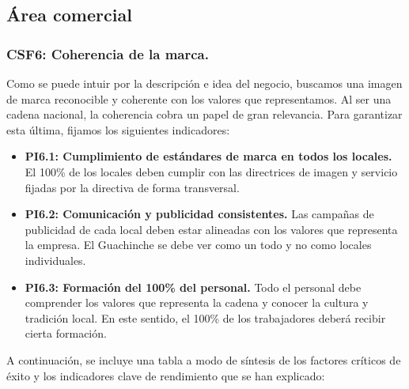 \documentclass[12pt]{opticajnl}
\begin{document}
\subsection{Área comercial}

\subsubsection*{CSF6: Coherencia de la marca.}

Como se puede intuir por la descripción e idea del negocio, buscamos una imagen de marca reconocible y coherente con los valores que representamos. Al ser una cadena nacional, la coherencia cobra un papel de gran relevancia. Para garantizar esta última, fijamos los siguientes indicadores:

\begin{itemize}
    \item \textbf{PI6.1: Cumplimiento de estándares de marca en todos los locales.} El 100\% de los locales deben cumplir con las directrices de imagen y servicio fijadas por la directiva de forma transversal.
    \item \textbf{PI6.2: Comunicación y publicidad consistentes.} Las campañas de publicidad de cada local deben estar alineadas con los valores que representa la empresa. El Guachinche se debe ver como un todo y no como locales individuales.
    \item \textbf{PI6.3: Formación del 100\% del personal.} Todo el personal debe comprender los valores que representa la cadena y conocer la cultura y tradición local. En este sentido, el 100\% de los trabajadores deberá recibir cierta formación.
\end{itemize}

A continuación, se incluye una tabla a modo de síntesis de los factores críticos de éxito y los indicadores clave de rendimiento que se han explicado:
\end{document}
